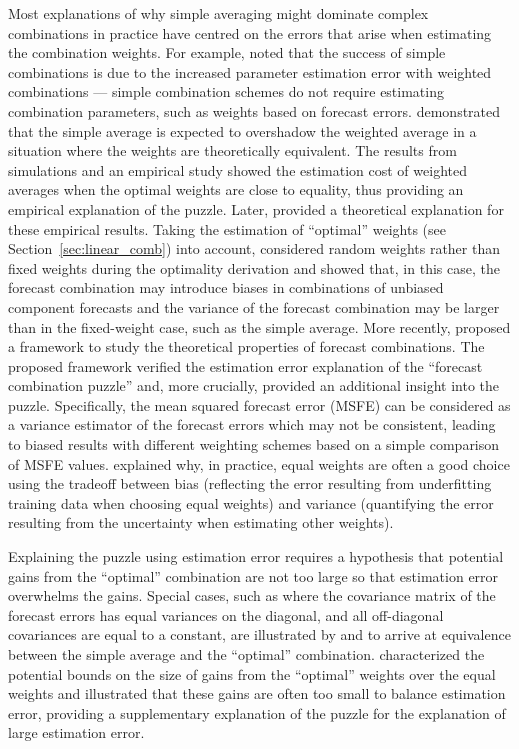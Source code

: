 \documentclass[a4paper,11pt]{article}
\begin{document}
Most explanations of why simple averaging might dominate complex combinations in practice have centred on the errors that arise when estimating the combination weights. For example, \citet{Timmermann2006-en} noted that the success of simple combinations is due to the increased parameter estimation error with weighted combinations --- simple combination schemes do not require estimating combination parameters, such as weights based on forecast errors. \citet{Smith2009-wd} demonstrated that the simple average is expected to overshadow the weighted average in a situation where the weights are theoretically equivalent. The results from simulations and an empirical study showed the estimation cost of weighted averages when the optimal weights are close to equality, thus providing an empirical explanation of the puzzle. Later, \citet{Claeskens2016-pv} provided a theoretical explanation for these empirical results. Taking the estimation of ``optimal'' weights (see Section~\ref{sec:linear_comb}) into account, \citet{Claeskens2016-pv} considered random weights rather than fixed weights during the optimality derivation and showed that, in this case, the forecast combination may introduce biases in combinations of unbiased component forecasts and the variance of the forecast combination may be larger than in the fixed-weight case, such as the simple average. More recently, \citet{Chan2018-jl} proposed a framework to study the theoretical properties of forecast combinations. The proposed framework verified the estimation error explanation of the ``forecast combination puzzle'' and, more crucially, provided an additional insight into the puzzle. Specifically, the mean squared forecast error (MSFE) can be considered as a variance estimator of the forecast errors which may not be consistent, leading to biased results with different weighting schemes based on a simple comparison of MSFE values. \citet{Blanc2020-pg} explained why, in practice, equal weights are often a good choice using the tradeoff between bias (reflecting the error resulting from underfitting training data when choosing equal weights) and variance (quantifying the error resulting from the uncertainty when estimating other weights).

Explaining the puzzle using estimation error requires a hypothesis that potential gains from the ``optimal'' combination are not too large so that estimation error overwhelms the gains. Special cases, such as where the covariance matrix of the forecast errors has equal variances on the diagonal, and all off-diagonal covariances are equal to a constant, are illustrated by \citet{Timmermann2006-en} and \citet{Hsiao2014-ug} to arrive at equivalence between the simple average and the ``optimal'' combination. \citet{Elliott2011-ab} characterized the potential bounds on the size of gains from the ``optimal'' weights over the equal weights and illustrated that these gains are often too small to balance estimation error, providing a supplementary explanation of the puzzle for the explanation of large estimation error.
\end{document}
